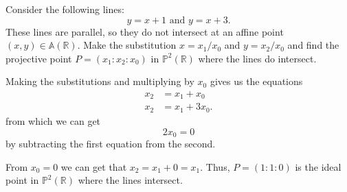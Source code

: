 \documentclass[12 pt, letterpaper]{hmcpset}
\begin{document}
\pagebreak

\begin{problem}[3]
	Consider the following lines:
	\[
		y = x + 1 \text{ and } y = x + 3.
	\]
	These lines are parallel, so they do not intersect at an affine point $(x, y) \in \mathbb{A}(\mathbb{R})$. Make the substitution $x = x_{1}/x_{0}$ and $y = x_{2}/x_{0}$ and find the projective point $P = (x_{1} : x_{2} : x_{0})$ in $\mathbb{P}^{2}(\mathbb{R})$ where the lines do intersect.
\end{problem}

\begin{solution}
	Making the substitutions and multiplying by $x_{0}$ gives us the equations
	\[
		\begin{split}
			x_{2} & = x_{1} + x_{0} \\
			x_{2} & = x_{1} + 3 x_{0}.
		\end{split}
	\]
	from which we can get
	 \[
		2 x_{0} = 0
	\]
	by subtracting the first equation from the second.

	From $x_{0} = 0$ we can get that $x_{2} = x_{1} + 0 = x_{1}$. Thus, $P = (1 : 1 : 0)$ is the ideal point in $\mathbb{P}^{2}(\mathbb{R})$ where the lines intersect.
\end{solution}
\end{document}

